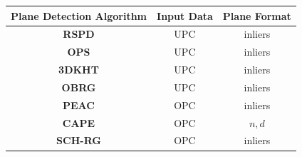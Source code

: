 \documentclass[main.tex]{subfiles}
\begin{document}
\begin{table}[H]
    \centering
    \begin{tabular}{c|c|c}
        \textbf{Plane Detection Algorithm}                               & \textbf{Input Data} & \textbf{Plane Format} \\ \hline %
        \textbf{RSPD} \cite{Araújo_Oliveira_2020}                        & UPC                 & inliers               \\  %
        \textbf{OPS} \cite{Sun_Mordohai_2019}                            & UPC                 & inliers               \\  %
        \textbf{3DKHT} \cite{LimbergerOliveira2015HT3D}                    & UPC                 & inliers               \\  %
        \textbf{OBRG} \cite{Vo_Truong-Hong_Laefer_Bertolotto_2015}       & UPC                 & inliers               \\  %
        \textbf{PEAC} \cite{Feng_Taguchi_Kamat_2014}                     & OPC                 & inliers               \\  %
        \textbf{CAPE} \cite{Proença_Gao_2018}                            & OPC                 & $n, d$                \\  %
        \textbf{SCH-RG} \cite{Mols_Li_Hanebeck_2020}                     & OPC                 & inliers               \\  %

\end{tabular}
\end{table}
\end{document}
